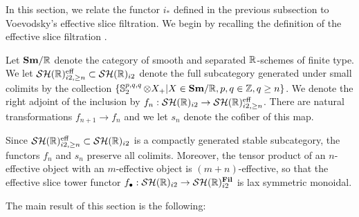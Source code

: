%


In this section, we relate the functor $i_*$ defined in the previous subsection to Voevodsky's effective slice filtration.
We begin by recalling the definition of the effective slice filtration \cite{VoeOpenProbs}.

\begin{dfn} \label{dfn:eff-slice}
  Let $\textbf{Sm} / \mathbb{R}$ denote the category of smooth and separated $\mathbb{R}$-schemes of finite type.
  We let $\mathcal{SH}(\mathbb{R})^{\mathrm{eff}} _{i2, \geq n} \subset \mathcal{SH}(\mathbb{R})_{i2}$ denote the full subcategory generated under small colimits by the collection $\{\operatorname{\mathbb{S}}_2^{p,q,q} \otimes X_+ \vert X \in \textbf{Sm} / \mathbb{R}, p,q \in \mathbb{Z}, q \geq n\}$.
  We denote the right adjoint of the inclusion by $f_n : \mathcal{SH}(\mathbb{R})_{i2} \to \mathcal{SH}(\mathbb{R})^{\mathrm{eff}} _{i2, \geq n}$. There are natural transformations $f_{n+1} \to f_{n}$ and we let $s_n$ denote the cofiber of this map.

  Since $\mathcal{SH}(\mathbb{R})^{\mathrm{eff}} _{i2, \geq n} \subset \mathcal{SH}(\mathbb{R})_{i2}$ is a compactly generated stable subcategory, the functors $f_n$ and $s_n$ preserve all colimits. Moreover, the tensor product of an $n$-effective object with an $m$-effective object is $(m+n)$-effective, so that the effective slice tower functor $f_\bullet : \mathcal{SH}(\mathbb{R})_{i2} \to \mathcal{SH}(\mathbb{R})_{i2} ^{\operatorname{\mathbf{Fil}}}$ is lax symmetric monoidal.
\end{dfn}

The main result of this section is the following:

